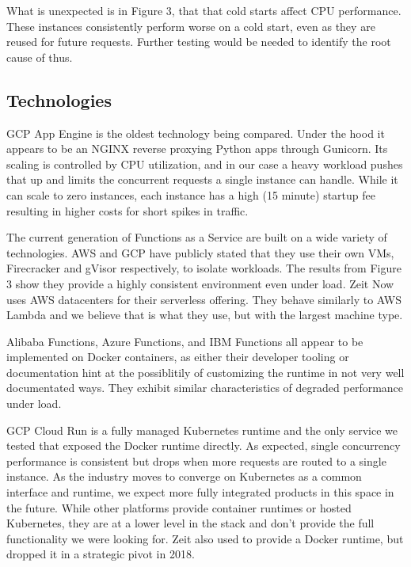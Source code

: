 \documentclass[11pt]{article}
\begin{document}
What is unexpected is in Figure 3, %
that that cold starts affect CPU performance.
These instances consistently perform worse on a cold start,
even as they are reused for future requests.
Further testing would be needed to identify the root cause of thus.

\subsection{Technologies}
GCP App Engine is the oldest technology being compared.
Under the hood it appears to be an NGINX reverse proxying Python apps through Gunicorn.
Its scaling is controlled by CPU utilization,
and in our case a heavy workload pushes that up
and limits the concurrent requests a single instance can handle.
While it can scale to zero instances,
each instance has a high (15 minute) startup fee %
resulting in higher costs for short spikes in traffic.

The current generation of Functions as a Service
are built on a wide variety of technologies.
AWS and GCP have publicly stated that they use their own VMs,
Firecracker and gVisor respectively, to isolate workloads.
The results from Figure 3 %
show they provide a highly consistent environment even under load.
Zeit Now uses AWS datacenters %
for their serverless offering.
They behave similarly to AWS Lambda
and we believe that is what they use, but with the largest machine type.

Alibaba Functions, Azure Functions, and IBM Functions
all appear to be implemented on Docker containers,
as either their developer tooling or documentation
hint at the possiblitily of customizing the runtime
in not very well documentated ways.
They exhibit similar characteristics of degraded performance under load.

GCP Cloud Run is a fully managed Kubernetes runtime and
the only service we tested that exposed the Docker runtime directly.
As expected, single concurrency performance is consistent
but drops when more requests are routed to a single instance.
As the industry moves to converge on Kubernetes as a common interface and runtime,
we expect more fully integrated products in this space in the future.
While other platforms provide container runtimes or hosted Kubernetes,
they are at a lower level in the stack and don't provide the full functionality we were looking for.
Zeit also used to provide a Docker runtime, but dropped it in a strategic pivot in 2018.
\end{document}
